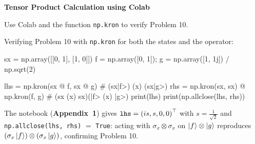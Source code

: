 \documentclass[a4paper, 10pt]{article}
\begin{document}
\begin{problem}
\textbf{Tensor Product Calculation using Colab}
\par Use Colab and the function \texttt{np.kron} to verify Problem 10.
\end{problem}

\begin{solution}
	\noindent Verifying Problem 10 with \texttt{np.kron} for both the states and the operator:
	\begin{codingbox*}
sx = np.array([[0, 1], [1, 0]])
f  = np.array([0, 1]); g = np.array([1, 1j]) / np.sqrt(2)

lhs = np.kron(sx @ f, sx @ g)          # (sx|f>) (x) (sx|g>)
rhs = np.kron(sx, sx) @ np.kron(f, g)  # (sx (x) sx)(|f> (x) |g>)
print(lhs)
print(np.allclose(lhs, rhs))
\end{codingbox*}
	\noindent The notebook (\textbf{Appendix~1}) gives \( \texttt{lhs} = \left(is, s, 0, 0\right)^{\top} \) with \( s = \tfrac{1}{\sqrt{2}} \)
	and \texttt{np.allclose(lhs, rhs)} \( = \) \texttt{True}: acting with \( \sigma_x \otimes \sigma_x \) on \( \ket{f} \otimes \ket{g} \)
	reproduces \( \left(\sigma_x\ket{f}\right) \otimes \left(\sigma_x\ket{g}\right) \), confirming Problem 10.
\end{solution}



\end{document}
